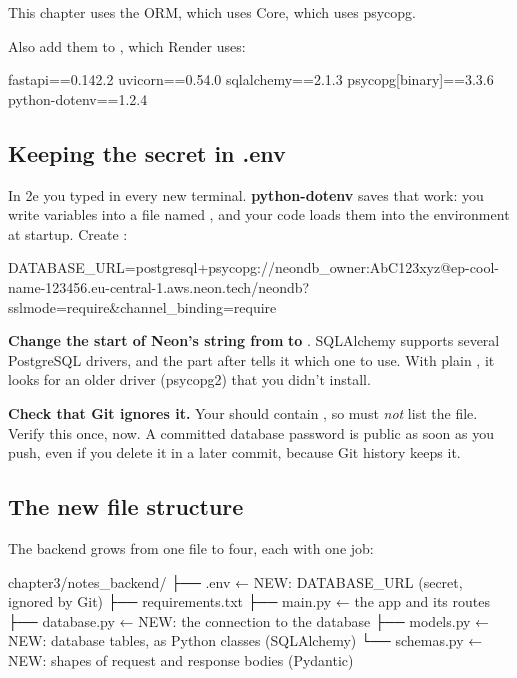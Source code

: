 This chapter uses the ORM, which uses Core, which uses psycopg.

Also add them to , which Render uses:

\begin{code}
fastapi==0.142.2
uvicorn==0.54.0
sqlalchemy==2.1.3
psycopg[binary]==3.3.6
python-dotenv==1.2.4
\end{code}

\subsection{Keeping the secret in .env}

In 2e you typed  in every new terminal. \textbf{python-dotenv} saves that work: you write variables into a file named , and your code loads them into the environment at startup. Create :

\begin{code}
DATABASE_URL=postgresql+psycopg://neondb_owner:AbC123xyz@ep-cool-name-123456.eu-central-1.aws.neon.tech/neondb?sslmode=require&channel_binding=require
\end{code}

\textbf{Change the start of Neon's string from}  \textbf{to} . SQLAlchemy supports several PostgreSQL drivers, and the part after \cd{+} tells it which one to use. With plain , it looks for an older driver (psycopg2) that you didn't install.

\textbf{Check that Git ignores it.} Your  should contain , so  must \emph{not} list the file. Verify this once, now. A committed database password is public as soon as you push, even if you delete it in a later commit, because Git history keeps it.

\subsection{The new file structure}

The backend grows from one file to four, each with one job:

\begin{code}
chapter3/notes_backend/
├── .env                ← NEW: DATABASE_URL (secret, ignored by Git)
├── requirements.txt
├── main.py             ← the app and its routes
├── database.py         ← NEW: the connection to the database
├── models.py           ← NEW: database tables, as Python classes (SQLAlchemy)
└── schemas.py          ← NEW: shapes of request and response bodies (Pydantic)
\end{code}


